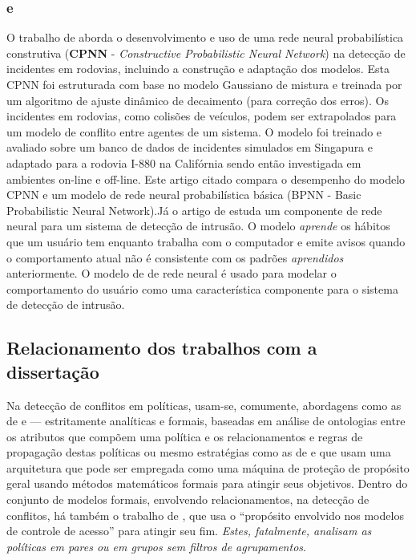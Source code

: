 \subsubsection{ e }
O trabalho de  aborda o desenvolvimento e uso de uma rede neural probabilística construtiva (\textbf{CPNN} - \textit{Constructive Probabilistic Neural Network}) na detecção de incidentes em rodovias, incluindo a construção e adaptação dos modelos. Esta CPNN foi estruturada com base no modelo Gaussiano de mistura e treinada por um algoritmo de ajuste dinâmico de decaimento (para correção dos erros). Os incidentes em rodovias, como colisões de veículos, podem ser extrapolados para um modelo de conflito entre agentes de um sistema. O modelo foi treinado e avaliado sobre um banco de dados de incidentes simulados em Singapura e adaptado para a rodovia I-880 na Califórnia sendo então investigada em ambientes on-line e off-line. Este artigo citado compara o desempenho do modelo CPNN e um modelo de rede neural probabilística básica (BPNN - Basic Probabilistic Neural Network).Já o artigo de  estuda um componente de rede neural para um sistema de detecção de intrusão. O modelo \textit{aprende} os hábitos que um usuário tem enquanto trabalha com o computador e emite avisos quando o comportamento atual não é consistente com os padrões \textit{aprendidos} anteriormente. O modelo de de rede neural  é usado para modelar o comportamento do usuário como uma característica componente para o sistema de detecção de intrusão.

\subsection{Relacionamento dos trabalhos com a dissertação}
Na detecção de conflitos em políticas, usam-se, comumente, abordagens como as de  e  --- estritamente analíticas e formais, baseadas em análise de ontologias entre os atributos que compõem uma política e os relacionamentos e regras de propagação destas políticas ou mesmo estratégias como as de  e  que usam uma arquitetura que pode ser empregada como uma máquina de proteção de propósito geral usando métodos matemáticos formais para atingir seus objetivos. Dentro do conjunto de modelos formais, envolvendo relacionamentos, na detecção de conflitos, há também o trabalho de , que usa o ``propósito envolvido nos modelos de controle de acesso'' para atingir seu fim. \textit{Estes, fatalmente, analisam as políticas em pares ou em grupos sem filtros de agrupamentos}.

